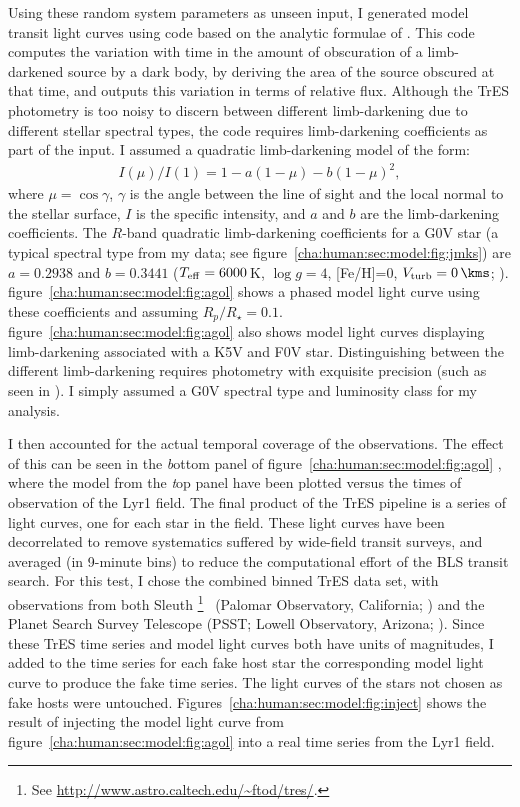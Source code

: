 Using these random system parameters as unseen input, I generated model transit light curves using code based on the analytic formulae of \citet{Mandel_Agol:apjl:2002a}.
This code computes the variation with time in the amount of obscuration of a limb-darkened source by a dark body, by deriving the area of the source obscured at that time, and outputs this variation in terms of relative flux.
Although the TrES photometry is too noisy to discern between different limb-darkening due to different stellar spectral types, the code requires limb-darkening coefficients as part of the input.
I assumed a quadratic limb-darkening model of the form:
\begin{eqnarray*}\label{cha:human:sec:model:eqn:limb}
I(\mu)/I(1) = 1-a(1-\mu)-b(1-\mu)^2,
\end{eqnarray*}
where $\mu=\cos{\gamma}$, $\gamma$ is the angle between the line of sight and the local normal to the stellar surface, $I$ is the specific intensity, and $a$ and $b$ are the limb-darkening coefficients.
The $R$-band quadratic limb-darkening coefficients for a G0V star (a typical spectral type from my data; see figure~\ref{cha:human:sec:model:fig:jmks}) are $a=0.2938$ and $b=0.3441$ ($T_{\rm eff}=6000$\,K, $\log{g}=4$, [Fe/H]=0, $V_{\rm turb}=0\,\kms$; \citealt{Claret:aa:2000a}).
figure~\ref{cha:human:sec:model:fig:agol} %
shows a phased model light curve using these coefficients and assuming $R_{p}/R_{\star}=0.1$.
figure~\ref{cha:human:sec:model:fig:agol} %
also shows model light curves displaying limb-darkening associated with a K5V and F0V star.
Distinguishing between the different limb-darkening requires photometry with exquisite precision (such as seen in \citealt{Brown_Charbonneau_Gilliland:apj:2001a}).
I simply assumed a G0V spectral type and luminosity class for my analysis.

I then accounted for the actual temporal coverage of the observations.
The effect of this can be seen in the {\textit bottom panel} of figure~\ref{cha:human:sec:model:fig:agol}%
, where the model from the {\textit top panel} have been plotted versus the times of observation of the Lyr1 field.
The final product of the TrES pipeline is a series of light curves, one for each star in the field.
These light curves have been decorrelated to remove systematics suffered by wide-field transit surveys, and averaged (in 9-minute bins) to reduce the computational effort of the BLS transit search.
For this test, I chose the combined binned TrES data set, with observations from both Sleuth%
\footnote{See \url{http://www.astro.caltech.edu/\~ftod/tres/}.}%
\ (Palomar Observatory, California; \citealt{ODonovan_Charbonneau_Kotredes:AIP:2004a}) and the Planet Search Survey Telescope (PSST;  Lowell Observatory, Arizona; \citealt{Dunham_Mandushev_Taylor:pasp:2004a}).
Since these TrES time series and model light curves both have units of magnitudes, I added to the time series for each fake host star the corresponding model light curve to produce the fake time series.
The light curves of the stars not chosen as fake hosts were untouched.
Figures~\ref{cha:human:sec:model:fig:inject} shows the result of injecting the model light curve from figure~\ref{cha:human:sec:model:fig:agol} %
into a real time series from the Lyr1 field.

